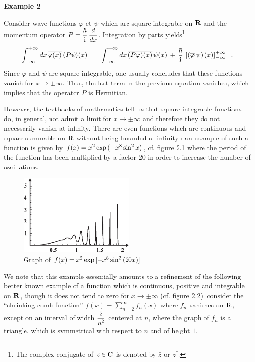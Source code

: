\documentclass[a4wide,12pt]{report}
\begin{document}
\bigskip
 

\noindent 
{\bf Example 2}
 
\medskip

Consider wave functions
$\varphi$ et $\psi$ which are square integrable on ${\bf R}$
and the momentum operator $P=
\displaystyle{\hbar \over {\rm i}} \, \displaystyle{d \over dx}$.
Integration by parts yields\footnote{The complex conjugate
of $z \in {\bf C}$ is denoted by $\bar z$ or $z^{\ast}$.} 
\[
\int_{-\infty}^{+\infty} dx \,  \overline{\varphi (x)} \,
(P \psi ) (x ) \ = \
\int_{-\infty}^{+\infty} dx \,
\overline{(P\varphi )(x)} \, \psi (x)   \, + \,
\displaystyle{\hbar \over {\rm i}} \, \left[ \left(
\overline{\varphi} \, \psi \right) (x) \right] _{-\infty}^{+\infty}
\ \ .
\]
Since $\varphi$ and $\psi$ are square integrable, one usually concludes
that these functions
vanish for $x \to \pm \infty$. Thus, the last term in the previous 
equation vanishes, which implies that the operator $P$
is Hermitian. 

However, the  textbooks of mathematics  tell us
that square integrable functions do, in general, not admit a
limit  for $x \to \pm \infty$ and therefore they do not necessarily 
vanish at infinity. 
There are even functions which are continuous and 
square summable
on ${\bf R}$ without being bounded at infinity
\cite{ri}: an example of such a function is given by
$f(x) = x^2 \, {\rm exp}\, (-x^8\, {\rm sin}^2 \, x)$,  
cf. figure 
2.1 where the period of the function has been multiplied 
by a factor $20$ in order to increase the number of 
oscillations. 

\bigskip 

\begin{figure}[h!]
\centerline{\includegraphics*[height=4cm,angle=0]{dessin1.eps}}
\caption{Graph of $f(x) = x^2 \, 
{\rm exp}\, [-x^8\, {\rm sin}^2 \, (20x)]$}
\end{figure}

\bigskip

\noindent We note that this example 
essentially 
amounts to a refinement of the following better known example
\cite{go} of a function which 
is continuous, positive and integrable on ${\bf R}$, 
though it  does not tend to zero for
$x \to \pm \infty$ (cf. figure 2.2): consider the ``shrinking
comb function''
$f(x) = \sum_{n=2}^{\infty} f_n(x)$ where $f_n$ vanishes on
${\bf R}$, except on an interval of width $\displaystyle{2 \over n^2}$
centered at $n$, where the graph of $f_n$ is a triangle, which is
symmetrical with respect to $n$ and of height $1$. 
\end{document}
